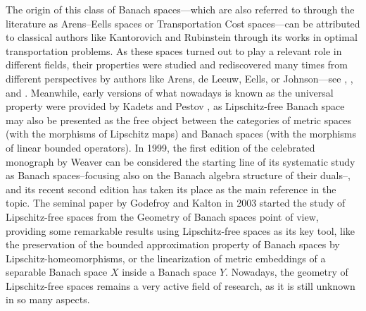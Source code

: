 \documentclass[11pt,reqno]{article}
\newcommand{\free}[1]{\mathcal{F}(#1)} %
\begin{document}
 The origin of this class of Banach spaces---which are also referred to through the literature as Arens--Eells spaces or Transportation Cost spaces---can be attributed to classical authors like Kantorovich and Rubinstein \cite{Kant-Rub} through its works in optimal transportation problems. As these spaces turned out to play a relevant role in different fields, their properties were studied and rediscovered many times from different perspectives by authors like Arens, de Leeuw, Eells, or Johnson---see \cite{Ar-Ee}, \cite{Johnson}, and \cite{deLeeuw}. Meanwhile, early versions of what nowadays is known as the universal property were provided by Kadets \cite{Kadets} and Pestov \cite{Pestov}, as Lipschitz-free Banach space may also be presented as the free object between the categories of metric spaces (with the morphisms of Lipschitz maps) and Banach spaces (with the morphisms of linear bounded operators). In 1999, the first edition of the celebrated monograph by Weaver can be considered the starting line of its systematic study as Banach spaces--focusing also on the Banach algebra structure of their duals--, and its recent second edition \cite{Weaver2} has taken its place as the main reference in the topic. The seminal paper \cite{GoKa03} by Godefroy and Kalton in 2003 started the study of Lipschitz-free spaces from the Geometry of Banach spaces point of view, providing some remarkable results using Lipschitz-free spaces as its key tool, like the preservation of the bounded approximation property of Banach spaces by Lipschitz-homeomorphisms, or the linearization of metric embeddings of a separable Banach space $X$ inside a Banach space $Y$. Nowadays, the geometry of Lipschitz-free spaces remains a very active field of research, as it is still unknown in so many aspects.


\end{document}
